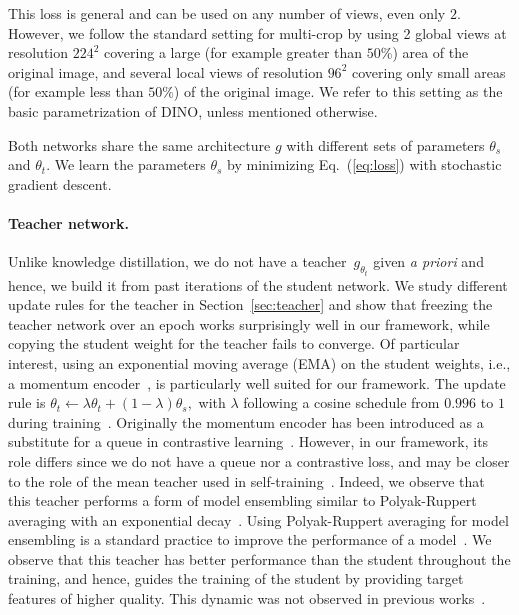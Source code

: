 This loss is general and can be used on any number of views, even only $2$. However, we follow the standard setting for multi-crop by using 2 global views at resolution $224^2$ covering a large (for example greater than $50\%$) area of the original image, and several local views of resolution $96^2$ covering only small areas (for example less than $50\%$) of the original image. We refer to this setting as the basic parametrization of DINO, unless mentioned otherwise.

Both networks share the same architecture $g$ with different sets of parameters $\theta_s$ and $\theta_t$.
We learn the parameters $\theta_s$ by minimizing Eq.~(\ref{eq:loss}) with stochastic gradient descent.

\paragraph{Teacher network.} Unlike knowledge distillation, we do not have a teacher~$g_{\theta_t}$ given \emph{a priori} and hence, we build it from past iterations of the student network. We study different update rules for the teacher in Section~\ref{sec:teacher} and show that freezing the teacher network over an epoch works surprisingly well in our framework, while copying the student weight for the teacher fails to converge. Of particular interest, using an exponential moving average (EMA) on the student weights, i.e., a momentum encoder~\cite{he2020momentum}, is particularly well suited for our framework. The update rule is $ \theta_t \leftarrow \lambda \theta_t + (1-\lambda) \theta_s,$ with $\lambda$ following a cosine schedule from $0.996$ to $1$ during training~\cite{grill2020bootstrap}. Originally the momentum encoder has been introduced as a substitute for a queue in contrastive learning~\cite{he2020momentum}. However, in our framework, its role differs since we do not have a queue nor a contrastive loss, and may be closer to the role of the mean teacher used in self-training~\cite{tarvainen2017mean}. Indeed, we observe that this teacher performs a form of model ensembling similar to Polyak-Ruppert averaging with an exponential decay~\cite{polyak1992acceleration, ruppert1988efficient}. Using Polyak-Ruppert averaging for model ensembling is a standard practice to improve the performance of a model~\cite{jean2014using}. We observe that this teacher has better performance than the student throughout the training, and hence, guides the training of the student by providing target features of higher quality. This dynamic was not observed in previous works~\cite{grill2020bootstrap, richemond2020byol}.

